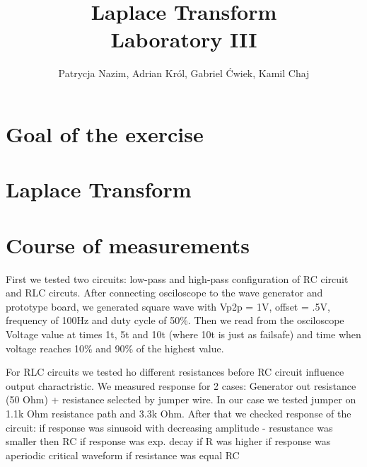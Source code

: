 \documentclass[notitlepage, a4paper, 11pt]{article}
\title{Laplace Transform\\
	\large Laboratory III}
\author{Patrycja Nazim, Adrian Król, Gabriel Ćwiek, Kamil Chaj}
\date{}
\begin{document}
	\maketitle
	\section{Goal of the exercise}
	\section{Laplace Transform}
	\section{Course of measurements}
		
		  First we tested two circuits: low-pass and high-pass configuration of RC circuit and RLC circuts. After connecting
		osciloscope to the wave generator and prototype board, we generated square wave with Vp2p = 1V, offset = .5V, frequency of 100Hz and duty cycle of 50\%. Then we read from the osciloscope Voltage value at times 1t, 5t and 10t (where 10t is just as failsafe) and time when voltage reaches 10\% and 90\% of the highest value.
		
		For RLC circuits we tested ho different resistances before RC circuit influence output charactristic. We measured response for 2 cases: Generator out resistance (50 Ohm) + resistance selected by jumper wire. In our case we tested jumper on 1.1k Ohm resistance path and 3.3k Ohm. After that we checked response of the circuit:
		if response was sinusoid with decreasing amplitude - resustance was smaller then RC
		if response was exp. decay if R was higher
		if response was aperiodic critical waveform if resistance was equal RC
		
\end{document}

